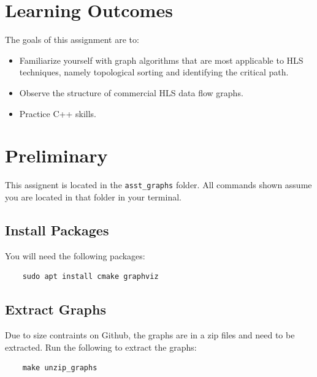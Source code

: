 



\setuppage



\maketitle
\thispagestyle{fancy}

\section{Learning Outcomes}
The goals of this assignment are to:
\begin{itemize}
	\item Familiarize yourself with graph algorithms that are most applicable to HLS techniques, namely topological sorting and identifying the critical path.
	\item Observe the structure of commercial HLS data flow graphs.
	\item Practice C++ skills.
\end{itemize}

\section{Preliminary}
This assignent is located in the \texttt{asst\_graphs} folder.  All commands shown assume you are located in that folder in your terminal.

\subsection{Install Packages}
You will need the following packages:
\begin{lstlisting}
	sudo apt install cmake graphviz
\end{lstlisting}

\subsection{Extract Graphs}
Due to size contraints on Github, the graphs are in a zip files and need to be extracted.  Run the following to extract the graphs:
\begin{lstlisting}
	make unzip_graphs
\end{lstlisting}

